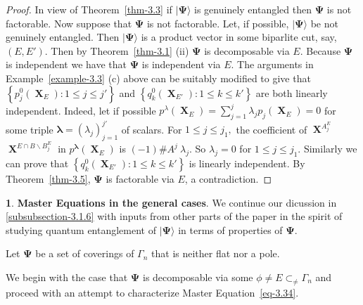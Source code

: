 \documentclass[a4paper,12pt]{article}
\DeclareMathOperator{\x}{\mathrm{X}}
\theoremstyle{definition}
\theoremstyle{underlinethm}
\theoremstyle{definition}
\newtheorem{subsubsec}{}[subsection]
\begin{document}
\begin{proof}
In view of Theorem~\eqref{thm-3.3} if $| \boldsymbol{\Psi} \rangle$ is genuinely entangled then $\boldsymbol{\Psi}$ is not factorable. Now suppose that $\boldsymbol{\Psi}$ is not factorable. Let, if possible, $| \boldsymbol{\Psi} \rangle$ be not genuinely entangled. Then $| \boldsymbol{\Psi} \rangle$ is a 
product vector in some biparlite cut, say, $(E, E')$. Then by Theorem~\eqref{thm-3.1} (ii) $\boldsymbol{\Psi}$ is decomposable via $E$. Because $\boldsymbol{\Psi}$ is independent we have that $\boldsymbol{\Psi}$ is independent via $E$. The arguments in Example~\eqref{example-3.3} (c) above can be suitably modified to give that $\left\{p_{j}^{0}(\boldsymbol{\x}_{E}) : 1 \leq j \leq j' \right\}$ and $\left\{q_{k}^{0} (\boldsymbol{\x}_{E'})  : 1 \leq k \leq k'\right\}$ are both linearly independent. Indeed, let if possible $p^{\lambda}(\boldsymbol{\x}_{E}) = \sum\limits_{j=1}^{j} \lambda_{j} p_{j}(\boldsymbol{\x}_{E}) = 0$ for some triple $\boldsymbol{\lambda} = (\lambda_{j})^{j'}_{j=1}$ of scalars. For $1 \leq j \leq j_{1}, $ the coefficient of $\boldsymbol{\x}^{A_{j}^{E}}$ $\boldsymbol{\x}^{E \cap B \smallsetminus B_{j}^{E}}$ in $p^{\boldsymbol{\lambda}} (\boldsymbol{\x}_{E})$ is $(-1) \# A^{j}~ \lambda_{j}$. So $\lambda_{j} = 0$ for $1 \leq j \leq j_{1}$. Similarly we can prove that $\left\{q_{k}^{0}(\boldsymbol{\x}_{E'}) : 1 \leq k \leq k' \right\}$ is linearly independent. By Theorem~\eqref{thm-3.5}, $\boldsymbol{\Psi}$ is factorable via $E$, a contradiction.
\end{proof}

\begin{subsubsec}\label{subsubsection-3.1.7}
\textbf{Master Equations in the general cases}. We continue our dicussion in \eqref{subsubsection-3.1.6} with inputs from other parts of the paper in the spirit of studying quantum entanglement of $| \boldsymbol{\Psi} \rangle$ in terms of properties of $\boldsymbol{\Psi}$.

Let $\boldsymbol{\Psi}$ be a set of coverings of $\Gamma_{n}$ that is neither flat nor a pole.

We begin with the case that $\boldsymbol{\Psi}$ is decomposable via some $\phi \neq E \subset_{\neq} \Gamma_{n}$ and proceed with an attempt to characterize Master Equation~\eqref{eq-3.34}.
\end{subsubsec}
\end{document}
